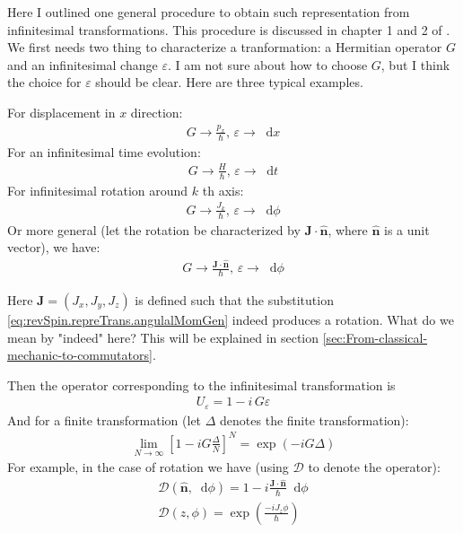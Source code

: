 \documentclass{article}
\newcommand*\diff{\mathop{}\!\mathrm{d}}
\numberwithin{equation}{subsection} %
\theoremstyle{definition}
\begin{document}
Here I outlined one general procedure to obtain such representation from
infinitesimal transformations. This procedure is discussed in chapter 1
and 2 of \cite{sakurai}.
We first needs two thing to characterize a tranformation: a Hermitian
operator $G$ and an infinitesimal change $\varepsilon$. I am not sure about
how to choose $G$, but I think the choice for $\varepsilon$ should be
clear. Here are three typical examples.

For displacement in $x$ direction:
\begin{align}
    G \rightarrow \frac{p_x}{\hbar},\, \varepsilon \rightarrow \diff x
\end{align}
For an infinitesimal time evolution:
\begin{align}
    G \rightarrow \frac{H}{\hbar},\, \varepsilon \rightarrow \diff t
\end{align}
For infinitesimal rotation around $k$ th axis:
\begin{align}
    G \rightarrow \frac{J_k}{\hbar},\, \varepsilon \rightarrow \diff \phi
    \label{eq:revSpin.repreTrans.angulalMomGen}
\end{align}
Or more general (let the rotation be characterized by $\mathbf{J}\cdot
\hat{\mathbf{n}}$, where $\hat{\mathbf{n}}$ is a unit vector), we have:
\begin{align}
    G \rightarrow \frac{\mathbf{J}\cdot \hat{\mathbf{n}} }{\hbar},\,
    \varepsilon \rightarrow \diff \phi
\end{align}

Here $\mathbf{J}=(J_x,J_y,J_z)$ is defined such that the substitution
\ref{eq:revSpin.repreTrans.angulalMomGen} indeed produces a rotation.
What do we mean by "indeed" here? This will be explained in section
\ref{sec:From-classical-mechanic-to-commutators}.
\label{page:question-def_of_J}

Then the operator corresponding to the infinitesimal transformation is
\begin{align}
    U_\varepsilon= 1-i\, G\varepsilon
\end{align}
And for a finite transformation (let $\Delta$ denotes the finite
transformation):
\begin{align}
    \lim_{N\to \infty}\left[ 1-iG\frac{\Delta}{N}\right]^N =
    \exp(-iG\Delta)
\end{align}
For example, in the case of rotation we have (using $\mathscr{D}$ to
denote the operator):
\begin{align}
    \mathscr{D}(\hat{\mathbf{n}},\diff \phi) =
    1-i\frac{\mathbf{J}\cdot\hat{\mathbf{n}}}{\hbar}\diff\phi
    \\
    \mathscr{D}(z,\phi)=\exp(\frac{-iJ_z \phi}{\hbar})
    \label{eq:revSpin.repreTrans.repreFiniteRot}
\end{align}
\end{document}
